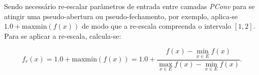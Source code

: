 Sendo necessário re-escalar parâmetros de entrada entre camadas \emph{PConv} para se atingir uma pseudo-abertura ou pseudo-fechamento, por exemplo, aplica-se $1.0 + \text{maxmin}(f(x))$ de modo que a re-escala compreenda o intervalo $[1, 2]$.
Para se aplicar a re-escala, calcula-se:

\begin{equation}
    f_{r}(x) = 1.0 + \text{maxmin}(f(x)) =
    1.0 + \frac{f(x) - \min_{x \in E}f(x)}{\max_{x \in E}f(x) - \min_{x \in E}f(x)}.
    \label{eq:equation10}
\end{equation}



